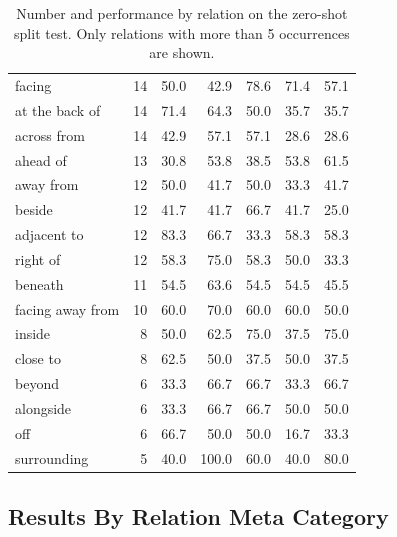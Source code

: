 \begin{table}[ht]
\begin{tabular}{lrrrrrr}
facing               &      14 &        50.0 &    42.9 &  78.6 &        71.4 &        57.1 \\
at the back of       &      14 &        71.4 &    64.3 &  50.0 &        35.7 &        35.7 \\
across from          &      14 &        42.9 &    57.1 &  57.1 &        28.6 &        28.6 \\
ahead of             &      13 &        30.8 &    53.8 &  38.5 &        53.8 &        61.5 \\
away from            &      12 &        50.0 &    41.7 &  50.0 &        33.3 &        41.7 \\
beside               &      12 &        41.7 &    41.7 &  66.7 &        41.7 &        25.0 \\
adjacent to          &      12 &        83.3 &    66.7 &  33.3 &        58.3 &        58.3 \\
right of             &      12 &        58.3 &    75.0 &  58.3 &        50.0 &        33.3 \\
beneath              &      11 &        54.5 &    63.6 &  54.5 &        54.5 &        45.5 \\
facing away from     &      10 &        60.0 &    70.0 &  60.0 &        60.0 &        50.0 \\
inside               &       8 &        50.0 &    62.5 &  75.0 &        37.5 &        75.0 \\
close to             &       8 &        62.5 &    50.0 &  37.5 &        50.0 &        37.5 \\
beyond               &       6 &        33.3 &    66.7 &  66.7 &        33.3 &        66.7 \\
alongside            &       6 &        33.3 &    66.7 &  66.7 &        50.0 &        50.0 \\
off                  &       6 &        66.7 &    50.0 &  50.0 &        16.7 &        33.3 \\
surrounding          &       5 &        40.0 &   100.0 &  60.0 &        40.0 &        80.0 \\
\bottomrule
\end{tabular}
\caption{Number and performance by relation on the zero-shot split test. Only relations with more than 5 occurrences are shown.}
\label{tab:results-by-relation-zeroshot}
\end{table}

\subsection{Results By Relation Meta Category}

